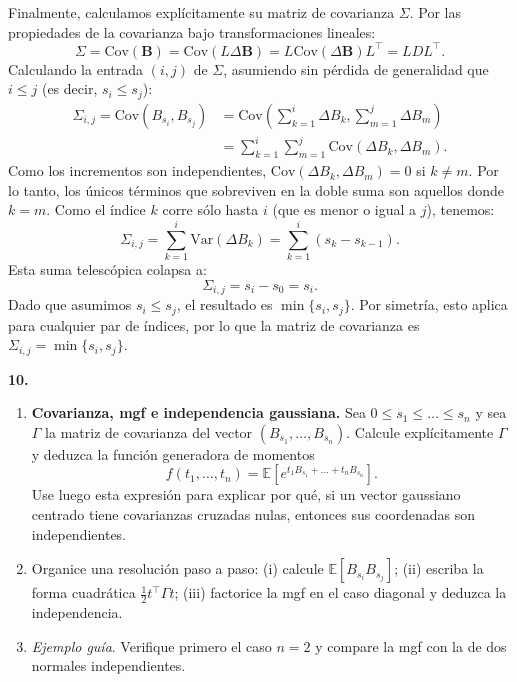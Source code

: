 \documentclass[11pt, letterpaper]{article}
\begin{document}
\begin{solucion}
    Finalmente, calculamos explícitamente su matriz de covarianza $\Sigma$.
    Por las propiedades de la covarianza bajo transformaciones lineales:
    \[ \Sigma = \text{Cov}(\mathbf{B}) = \text{Cov}(L \Delta \mathbf{B}) = L \text{Cov}(\Delta \mathbf{B}) L^\top = L D L^\top. \]
    Calculando la entrada $(i,j)$ de $\Sigma$, asumiendo sin pérdida de generalidad que $i \le j$ (es decir, $s_i \le s_j$):
    \begin{align*}
        \Sigma_{i,j} = \text{Cov}(B_{s_i}, B_{s_j}) &= \text{Cov} \left( \sum_{k=1}^i \Delta B_k, \sum_{m=1}^j \Delta B_m \right) \\
        &= \sum_{k=1}^i \sum_{m=1}^j \text{Cov}(\Delta B_k, \Delta B_m).
    \end{align*}
    Como los incrementos son independientes, $\text{Cov}(\Delta B_k, \Delta B_m) = 0$ si $k \neq m$. Por lo tanto, los únicos términos que sobreviven en la doble suma son aquellos donde $k=m$. Como el índice $k$ corre sólo hasta $i$ (que es menor o igual a $j$), tenemos:
    \[ \Sigma_{i,j} = \sum_{k=1}^i \text{Var}(\Delta B_k) = \sum_{k=1}^i (s_k - s_{k-1}). \]
    Esta suma telescópica colapsa a:
    \[ \Sigma_{i,j} = s_i - s_0 = s_i. \]
    Dado que asumimos $s_i \le s_j$, el resultado es $\min\{s_i, s_j\}$. Por simetría, esto aplica para cualquier par de índices, por lo que la matriz de covarianza es $\Sigma_{i,j} = \min\{s_i, s_j\}$.
\end{solucion}

\newpage

\begin{ejercicio}
    \textbf{10.} 
    \begin{enumerate}
        \item \textbf{Covarianza, mgf e independencia gaussiana.} Sea $0 \le s_1 \le \dots \le s_n$ y sea $\Gamma$ la matriz de covarianza del vector $(B_{s_1}, \dots, B_{s_n})$. Calcule explícitamente $\Gamma$ y deduzca la función generadora de momentos
        $$f(t_1, \dots, t_n) = \mathbb{E}[e^{t_1 B_{s_1} + \dots + t_n B_{s_n}}].$$
        Use luego esta expresión para explicar por qué, si un vector gaussiano centrado tiene covarianzas cruzadas nulas, entonces sus coordenadas son independientes.
        \item Organice una resolución paso a paso: (i) calcule $\mathbb{E}[B_{s_i} B_{s_j}]$; (ii) escriba la forma cuadrática $\frac{1}{2} t^\top \Gamma t$; (iii) factorice la mgf en el caso diagonal y deduzca la independencia.
        \item \textit{Ejemplo guía}. Verifique primero el caso $n = 2$ y compare la mgf con la de dos normales independientes.
    \end{enumerate}
\end{ejercicio}
\end{document}
